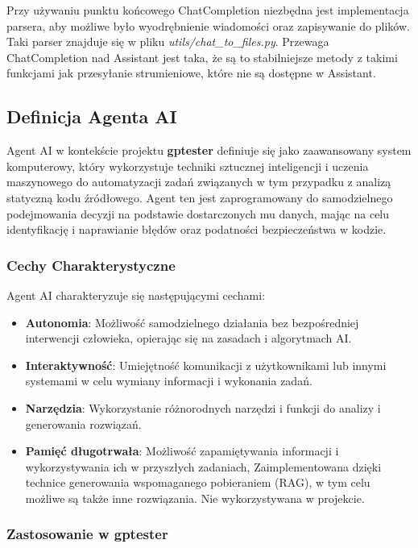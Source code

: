 
\restoregeometry

Przy używaniu punktu końcowego ChatCompletion niezbędna jest implementacja parsera, aby możliwe było wyodrębnienie wiadomości oraz zapisywanie do plików. Taki parser znajduje się w pliku \textit{utils/chat\_to\_files.py}. Przewaga ChatCompletion nad Assistant jest taka, że są to stabilniejsze metody z takimi funkcjami jak przesyłanie strumieniowe, które nie są dostępne w Assistant. 

\subsection{Definicja Agenta AI}
Agent AI w kontekście projektu \textbf{gptester} definiuje się jako zaawansowany system komputerowy, który wykorzystuje techniki sztucznej inteligencji i uczenia maszynowego do automatyzacji zadań związanych w tym przypadku z analizą statyczną kodu źródłowego. Agent ten jest zaprogramowany do samodzielnego podejmowania decyzji na podstawie dostarczonych mu danych, mając na celu identyfikację i naprawianie błędów oraz podatności bezpieczeństwa w kodzie.

\subsubsection{Cechy Charakterystyczne}

Agent AI charakteryzuje się następującymi cechami:

\begin{itemize}
    \item \textbf{Autonomia}: Możliwość samodzielnego działania bez bezpośredniej interwencji człowieka, opierając się na zasadach i algorytmach AI.
    \item \textbf{Interaktywność}: Umiejętność komunikacji z użytkownikami lub innymi systemami w celu wymiany informacji i wykonania zadań.
    \item \textbf{Narzędzia}: Wykorzystanie różnorodnych narzędzi i funkcji do analizy i generowania rozwiązań.
    \item \textbf{Pamięć długotrwała}: Możliwość zapamiętywania informacji i wykorzystywania ich w przyszłych zadaniach, Zaimplementowana dzięki technice generowania wspomaganego pobieraniem (RAG), w tym celu możliwe są także inne rozwiązania. Nie wykorzystywana w projekcie.
\end{itemize}

\subsubsection{Zastosowanie w \textbf{gptester}}

